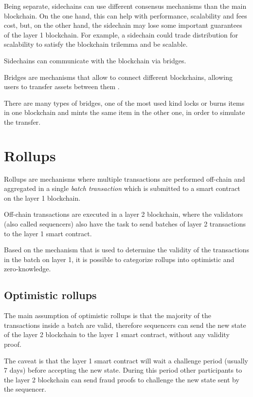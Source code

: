 \documentclass[12pt]{article}
\begin{document}
Being separate, sidechains can use different consensus mechanisms than the main blockchain. On the one hand, this can help with performance, scalability and fees cost, but, on the other hand, the sidechain may lose some important guarantees of the layer 1 blockchain.
For example, a sidechain could trade distribution for scalability to satisfy the blockchain trilemma and be scalable.

Sidechains can communicate with the blockchain via bridges.

Bridges are mechanisms that allow to connect different blockchains, allowing users to transfer assets between them \cite{ethereum_bridges}.

There are many types of bridges, one of the most used kind locks or burns items in one blockchain and mints the same item in the other one, in order to simulate the transfer.

\section{Rollups} \label{section:rollups}
Rollups are mechanisms where multiple transactions are performed off-chain and aggregated in a single \textit{batch transaction} which is submitted to a smart contract on the layer 1 blockchain.

Off-chain transactions are executed in a layer 2 blockchain, where the validators (also called sequencers) also have the task to send batches of layer 2 transactions to the layer 1 smart contract.

Based on the mechanism that is used to determine the validity of the transactions in the batch on layer 1, it is possible to categorize rollups into optimistic and zero-knowledge.

\subsection{Optimistic rollups} \label{subsection:optimistic_rollups}
The main assumption of optimistic rollups is that the majority of the transactions inside a batch are valid, therefore sequencers can send the new state of the layer 2 blockchain to the layer 1 smart contract, without any validity proof.

The caveat is that the layer 1 smart contract will wait a challenge period (usually 7 days) before accepting the new state. 
During this period other participants to the layer 2 blockchain can send fraud proofs to challenge the new state sent by the sequencer.
\end{document}

